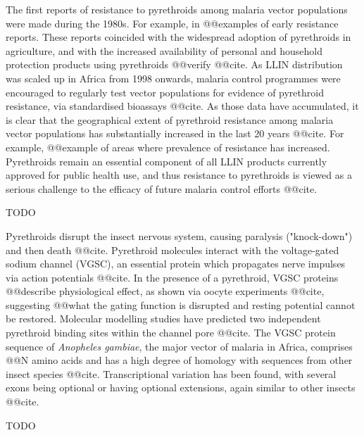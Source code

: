 \documentclass[a4paper,11pt,abstracton,hidelinks]{scrartcl}
\begin{document}
The first reports of resistance to pyrethroids among malaria vector populations were made during the 1980s.
%
For example, in @@examples of early resistance reports.
%
These reports coincided with the widespread adoption of pyrethroids in agriculture, and with the increased availability of personal and household protection products using pyrethroids @@verify @@cite.
%
As LLIN distribution was scaled up in Africa from 1998 onwards, malaria control programmes were encouraged to regularly test vector populations for evidence of pyrethroid resistance, via standardised bioassays @@cite.
%
As those data have accumulated, it is clear that the geographical extent of pyrethroid resistance among malaria vector populations has substantially increased in the last 20 years @@cite.
%
For example, @@example of areas where prevalence of resistance has increased.
%
Pyrethroids remain an essential component of all LLIN products currently approved for public health use, and thus resistance to pyrethroids is viewed as a serious challenge to the efficacy of future malaria control efforts @@cite.


%
TODO


%
Pyrethroids disrupt the insect nervous system, causing paralysis ("knock-down") and then death @@cite.
%
Pyrethroid molecules interact with the voltage-gated sodium channel (VGSC), an essential protein which propagates nerve impulses via action potentials @@cite.
%
In the presence of a pyrethroid, VGSC proteins @@describe physiological effect, as shown via oocyte experiments @@cite, suggesting @@what the gating function is disrupted and resting potential cannot be restored.
%
Molecular modelling studies have predicted two independent pyrethroid binding sites within the channel pore @@cite.
%
The VGSC protein sequence of \textit{Anopheles gambiae}, the major vector of malaria in Africa, comprises @@N amino acids and has a high degree of homology with sequences from other insect species @@cite.
%
Transcriptional variation has been found, with several exons being optional or having optional extensions, again similar to other insects @@cite.


%
TODO
\end{document}
